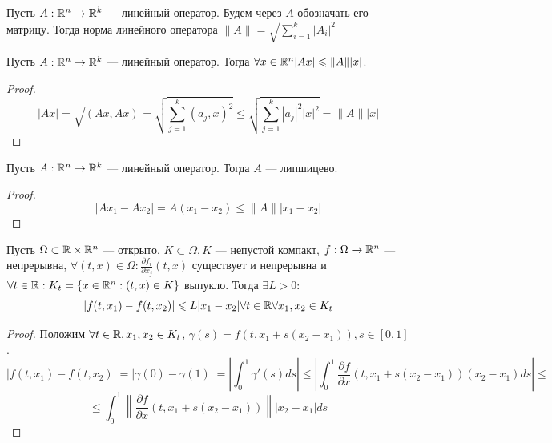 \begin{definition}
	Пусть \(A: \mathbb{R}^n \rightarrow \mathbb{R}^k\) --- линейный оператор. Будем через \(A\) обозначать его матрицу. Тогда норма линейного оператора \(\|A\| = \sqrt{\sum_{i = 1}^k |A_i|^2}\)
\end{definition}

\begin{proposition}
	Пусть \(A: \mathbb{R}^n \rightarrow \mathbb{R}^k\) --- линейный оператор. Тогда \(\forall x \in \mathbb{R}^n |Ax| \leqslant \|A\||x|\).
\end{proposition}
\begin{proof}
	\[|Ax| = \sqrt{(Ax, Ax)} = \sqrt{\sum_{j = 1}^k (a_j, x)^2} \le \sqrt{\sum_{j = 1}^k |a_j|^2|x|^2} = \|A\||x|\]
\end{proof}


\begin{corollary}
	Пусть \(A: \mathbb{R}^n \rightarrow \mathbb{R}^k\) --- линейный оператор. Тогда \(A\) --- липшицево.
\end{corollary}
\begin{proof}
	\[|Ax_1 - Ax_2| = A(x_1 - x_2) \le \|A\||x_1 - x_2|\]
\end{proof}

\begin{proposition}
	Пусть \(\Omega \subset \mathbb{R} \times \mathbb{R}^n\) --- открыто, \(K \subset \Omega, K\) --- непустой компакт, \(f: \Omega \rightarrow \mathbb{R}^n\) --- непрерывна, \(\forall (t, x) \in \Omega: \frac{\partial{f_i}}{\partial{x_j}}(t, x)\) существует и непрерывна и \(\forall t \in \mathbb{R}: K_t = \{x \in \mathbb{R}^n: (t, x) \in K\}\) выпукло. Тогда \(\exists L > 0\):
	\[|f(t, x_1) - f(t, x_2)| \leqslant L|x_1 - x_2| \forall t \in \mathbb{R} \forall x_1, x_2 \in K_t\]
\end{proposition}
\begin{proof}
	Положим \(\forall t \in \mathbb{R}, x_1, x_2 \in K_t\), \(\gamma(s) = f(t, x_1 + s(x_2 - x_1)), s \in [0, 1]\).
	\[|f(t, x_1) - f(t, x_2)| = |\gamma(0) - \gamma(1)| = \left|\int_0^1 \gamma'(s)ds\right| \le \left|\int_0^1 \frac{\partial{f}}{\partial{x}}(t, x_1 + s(x_2 - x_1))(x_2 - x_1)ds\right| \le\]
	\[\le \int_0^1 \left\|\frac{\partial{f}}{\partial{x}}(t, x_1 + s(x_2 - x_1))\right\||x_2 - x_1|ds\]
\end{proof}

